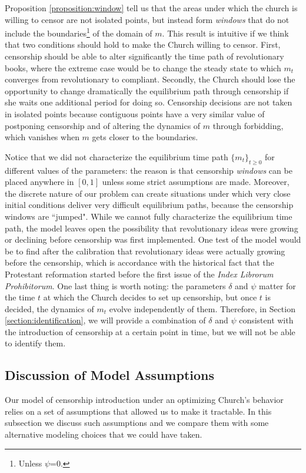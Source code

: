 \documentclass[12pt]{article}
\begin{document}
Proposition \ref{proposition:window} tell us that the areas under which the church is willing to censor are not isolated points, but instead form \textit{windows} that do not include the boundaries\footnote{Unless $\psi$=0.} of the domain of $m$. This result is intuitive if we think that two conditions should hold to make the Church willing to censor. First, censorship should be able to alter significantly the time path of revolutionary books, where the extreme case would be to change the steady state to which $m_t$ converges from revolutionary to compliant. Secondly, the Church should lose the opportunity to change dramatically the equilibrium path through censorship if she waits one additional period for doing so. Censorship decisions are not taken in isolated points because contiguous points have a very similar value of postponing censorship and of altering the dynamics of $m$ through forbidding, which vanishes when $m$ gets closer to the boundaries.

Notice that we did not characterize the equilibrium time path $\{m_t\}_{t\geq0}$ for different values of the parameters: the reason is that censorship \textit{windows} can be placed anywhere in $[0,1]$ unless some strict assumptions are made. Moreover, the discrete nature of our problem can create situations under which very close initial conditions deliver very difficult equilibrium paths, because the censorship windows are ``jumped". While we cannot fully characterize the equilibrium time path, the model leaves open the possibility that revolutionary ideas were growing or declining before censorship was first implemented. One test of the model would be to find after the calibration that revolutionary ideas were actually growing before the censorship, which is accordance with the historical fact that the Protestant reformation started before the first issue of the \textit{Index Librorum Prohibitorum}. One last thing is worth noting: the parameters $\delta$ and $\psi$ matter for the time $t$ at which the Church decides to set up censorship, but once $t$ is decided, the dynamics of $m_t$ evolve independently of them. Therefore, in Section \ref{section:identification}, we will provide a combination of $\delta$ and $\psi$ consistent with the introduction of censorship at a certain point in time, but we will not be able to identify them.

\subsection{Discussion of Model Assumptions}
Our model of censorship introduction under an optimizing Church's behavior relies on a set of assumptions that allowed us to make it tractable. In this subsection we discuss such assumptions and we compare them with some alternative modeling choices that we could have taken.
\end{document}
